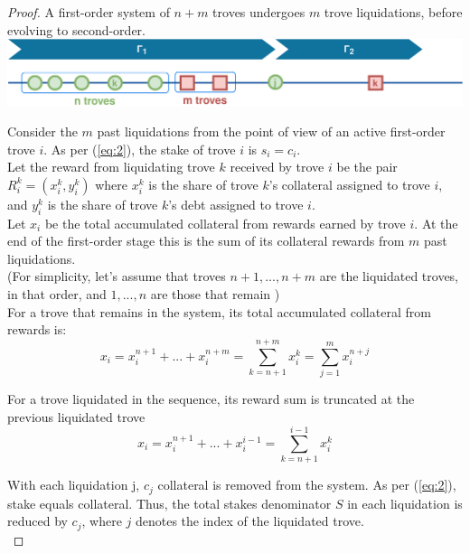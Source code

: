 \documentclass[reqno]{article}
\begin{document}
\begin{proof}
A first-order system of $n+m$ troves undergoes $m$ trove liquidations, before evolving to second-order.\\

    \includegraphics[width=\linewidth]{System_order_evolution_1_proof.png}

Consider the $m$ past liquidations from the point of view of an active first-order trove $i$. As per (\ref{eq:2}), the stake of trove $i$ is $s_i = c_i$.\\

Let the reward from liquidating trove $k$ received by trove $i$ be the pair $R_i^k = (x_i^k, y_i^k)$ where $x_i^k$ is the share of trove $k$’s collateral assigned to trove $i$, and $y_i^k$ is the share of trove $k$’s debt assigned to trove $i$.\\

Let $x_i$ be the total accumulated collateral from rewards earned by trove $i$. At the end of the first-order stage this is the sum of its collateral rewards from $m$ past liquidations.\\

(For simplicity, let’s assume that troves $n+1, ..., n+m$ are the liquidated troves, in that order, and $1, ..., n$ are those that remain )\\

For a trove that remains in the system, its total accumulated collateral from rewards is:\\

\begin{equation} \label{eq:collreward}
  x_i = x_i^{n+1} + ... + x_i^{n+m} = \sum_{k=n+1}^{n+m}x_i^k = \sum_{j=1}^{m}x_i^{n+j}
\end{equation}

For a trove liquidated in the sequence, its reward sum is truncated at the previous liquidated trove \\

\begin{equation}
  x_i = x_i^{n+1} + ... + x_i^{i-1} = \sum_{k=n+1}^{i-1}x_i^k
\end{equation}

With each liquidation j, $c_j$ collateral is removed from the system. As per (\ref{eq:2}), stake equals collateral. Thus, the total stakes denominator $S$ in each liquidation is reduced by $c_j$, where $j$ denotes the index of the liquidated trove.\\ 



\end{proof}
\end{document}
